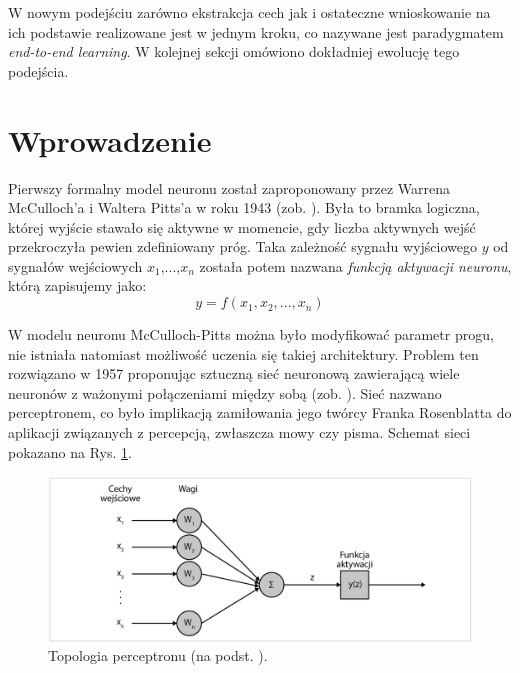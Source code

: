W nowym podejściu zarówno ekstrakcja cech jak i ostateczne wnioskowanie \linebreak na ich podstawie realizowane jest w jednym kroku, co nazywane jest paradygmatem \textit{end-to-end learning}. W kolejnej sekcji omówiono dokładniej  ewolucję tego podejścia. 

\section{Wprowadzenie}
\label{seq:DL_intro}
Pierwszy formalny model neuronu został zaproponowany przez Warrena McCulloch'a i Waltera Pitts'a w roku 1943 (zob. \cite{McCulloch1943}). Była to bramka logiczna, której wyjście stawało się aktywne w momencie, gdy liczba aktywnych wejść przekroczyła pewien zdefiniowany próg. Taka zależność sygnału wyjściowego $y$ od sygnałów wejściowych $x_1$,...,$x_n$ została potem nazwana \textit{funkcją aktywacji neuronu}, którą zapisujemy jako:
\begin{equation}
\label{eqActFunc}
y=f\left(x_1, x_2,..., x_n\right)
\end{equation}

W modelu neuronu McCulloch-Pitts można było modyfikować parametr progu, nie istniała natomiast możliwość uczenia się takiej architektury. Problem ten rozwiązano w 1957 proponując sztuczną sieć neuronową zawierającą wiele neuronów \linebreak z ważonymi połączeniami między sobą (zob. \cite{Rosenblatt1957}). Sieć nazwano perceptronem, \linebreak co było implikacją zamiłowania jego twórcy Franka Rosenblatta do aplikacji związanych z percepcją, zwłaszcza mowy czy pisma. Schemat sieci pokazano na Rys. \ref{Perceptron}.
\begin{figure}[h!]
	\centering
	\includegraphics[width=1\textwidth]{figures/perceptron.png}
	\caption{Topologia perceptronu (na podst. \cite{Rosenblatt1957}).}
	\label{Perceptron}
\end{figure}


